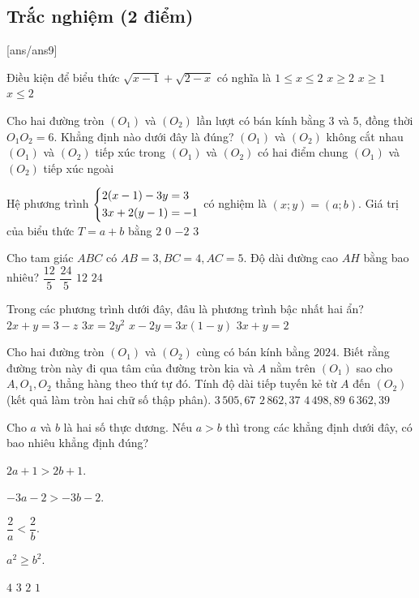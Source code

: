 \setcounter{ex}{0} %
\subsection{Trắc nghiệm (2 điểm)}
[ans/ans9] 

\begin{ex}
Điều kiện để biểu thức $\sqrt{x-1}+\sqrt{2-x}$ có nghĩa là
\choice
{\True $1 \le x \le 2$}
{$x \ge 2$}
{$x \ge 1$}
{$x \le 2$}
\end{ex}

\begin{ex}
Cho hai đường tròn $(O_1)$ và $(O_2)$ lần lượt có bán kính bằng $3$ và $5$, đồng thời $O_1O_2=6$. Khẳng định nào dưới đây là đúng?
\choice
{$(O_1)$ và $(O_2)$ không cắt nhau}
{$(O_1)$ và $(O_2)$ tiếp xúc trong}
{\True $(O_1)$ và $(O_2)$ có hai điểm chung}
{$(O_1)$ và $(O_2)$ tiếp xúc ngoài}
\end{ex}

\begin{ex}
Hệ phương trình $\left\{\begin{aligned}&2(x-1)-3y=3\\
&3x+2(y-1)=-1\end{aligned}\right.$ có nghiệm là $(x;y)=(a;b)$. Giá trị của biểu thức $T=a+b$ bằng
\choice
{$2$}
{\True $0$}
{$-2$}
{$3$}
\end{ex}

\begin{ex}
Cho tam giác $ABC$ có $AB=3, BC=4, AC=5$. Độ dài đường cao $AH$ bằng bao nhiêu?
\choice
{\True $\dfrac{12}{5}$}
{$\dfrac{24}{5}$}
{$12$}
{$24$}
\end{ex}

\begin{ex}
Trong các phương trình dưới đây, đâu là phương trình bậc nhất hai ẩn?
\choice
{$2x+y=3-z$}
{$3x=2y^2$}
{$x-2y=3x(1-y)$}
{\True $3x+y=2$}
\end{ex}

\begin{ex}
Cho hai đường tròn $(O_1)$ và $(O_2)$ cùng có bán kính bằng $2024$. Biết rằng đường tròn này đi qua tâm của đường tròn kia và $A$ nằm trên $(O_1)$ sao cho $A,O_1,O_2$ thẳng hàng theo thứ tự đó. Tính độ dài tiếp tuyến kẻ từ $A$ đến $(O_2)$ (kết quả làm tròn hai chữ số thập phân).
\choice
{\True $3\,505{,}67$}
{$2\,862{,}37$}
{$4\,498{,}89$}
{$6\,362{,}39$}
\end{ex}

\begin{ex}
Cho $a$ và $b$ là hai số thực dương. Nếu $a>b$ thì trong các khẳng định dưới đây, có bao nhiêu khẳng định đúng?
	\begin{listEX}[4]
		\item[i.] $2a+1>2b+1$.
		\item[ii.] $-3a-2>-3b-2$.
		\item[iii.] $\dfrac{2}{a}<\dfrac{2}{b}$.
		\item[iv.] $a^2\geq b^2$.
	\end{listEX}
\choice
{$4$}
{\True $3$}
{$2$}
{$1$}
\end{ex}

